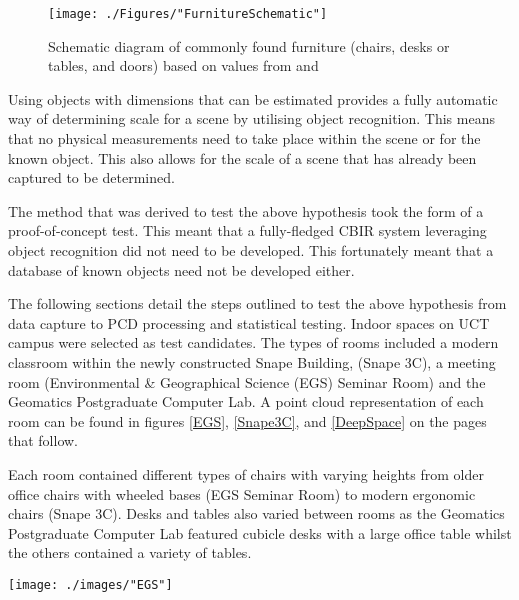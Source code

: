\clearpage



\vspace*{1cm}
\begin{figure}[!h]
	\centering
	\texttt{[image: ./Figures/"FurnitureSchematic"]}
	\caption[Schematic diagram of furniture]{Schematic diagram of commonly found furniture (chairs, desks or tables, and doors) based on values from \citet{lefler_choosing_2004} and \citet{griggs_typical_2001}}
	\label{furniture}
\end{figure}

Using objects with dimensions that can be estimated provides a fully automatic way of determining scale for a scene by utilising object recognition. This means that no physical measurements need to take place within the scene or for the known object. This also allows for the scale of a scene that has already been captured to be determined. 

The method that was derived to test the above hypothesis took the form of a proof-of-concept test. This meant that a fully-fledged CBIR system leveraging object recognition did not need to be developed. This fortunately meant that a database of known objects need not be developed either. 

The following sections detail the steps outlined to test the above hypothesis from data capture to PCD processing and statistical testing. Indoor spaces on UCT campus were selected as test candidates. The types of rooms included a modern classroom within the newly constructed Snape Building, (Snape 3C), a meeting room (Environmental \& Geographical Science (EGS) Seminar Room) and the Geomatics Postgraduate Computer Lab. A point cloud representation of each room can be found in figures \ref{EGS}, \ref{Snape3C}, and \ref{DeepSpace} on the pages that follow.

Each room contained different types of chairs with varying heights from older office chairs with wheeled bases (EGS Seminar Room) to modern ergonomic chairs (Snape 3C). Desks and tables also varied between rooms as the Geomatics Postgraduate Computer Lab featured cubicle desks with a large office table whilst the others contained a variety of tables.
\newpage

\begin{sidewaysfigure}[h!]
	\centering
	\texttt{[image: ./images/"EGS"]}
	\caption{A point cloud representation of the EGS Seminar Room.\label{EGS}}
\end{sidewaysfigure}

